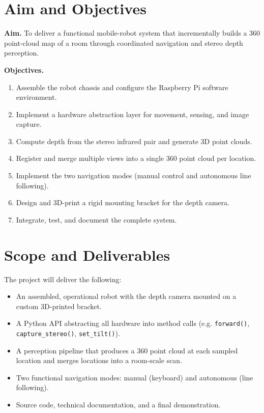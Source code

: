 \documentclass[11pt,a4paper]{article}
\begin{document}
\section{Aim and Objectives}
\textbf{Aim.} To deliver a functional mobile-robot system that incrementally builds a 360\textdegree{}
point-cloud map of a room through coordinated navigation and stereo depth perception.

\noindent\textbf{Objectives.}
\begin{enumerate}
\item Assemble the robot chassis and configure the Raspberry Pi software environment.
\item Implement a hardware abstraction layer for movement, sensing, and image capture.
\item Compute depth from the stereo infrared pair and generate 3D point clouds.
\item Register and merge multiple views into a single 360\textdegree{} point cloud per location.
\item Implement the two navigation modes (manual control and autonomous line following).
\item Design and 3D-print a rigid mounting bracket for the depth camera.
\item Integrate, test, and document the complete system.
\end{enumerate}

\section{Scope and Deliverables}
The project will deliver the following:
\begin{itemize}
\item An assembled, operational robot with the depth camera mounted on a custom 3D-printed bracket.
\item A Python API abstracting all hardware into method calls (e.g. \texttt{forward()}, \texttt{capture\_stereo()}, \texttt{set\_tilt()}).
\item A perception pipeline that produces a 360\textdegree{} point cloud at each sampled location and merges locations into a room-scale scan.
\item Two functional navigation modes: manual (keyboard) and autonomous (line following).
\item Source code, technical documentation, and a final demonstration.
\end{itemize}
\end{document}
